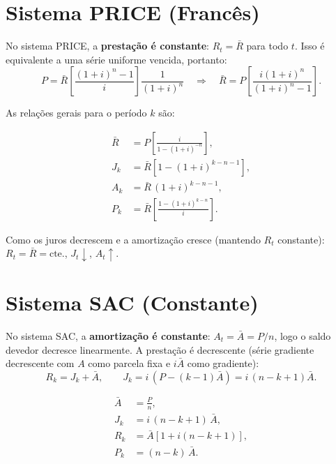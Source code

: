 \section{Sistema PRICE (Francês)}

No sistema PRICE, a \textbf{prestação é constante}: $R_t = \bar{R}$ para todo $t$.
Isso é equivalente a uma série uniforme vencida, portanto:
\[
  P = \bar{R}\left[\frac{(1+i)^n - 1}{i}\right]\frac{1}{(1+i)^n}
  \quad\Rightarrow\quad
  \bar{R} = P\left[\frac{i(1+i)^n}{(1+i)^n-1}\right].
\]

As relações gerais para o período $k$ são:
\begin{resultado}
\begin{align*}
  \bar{R}   &= P\left[\frac{i}{1-(1+i)^{-n}}\right], \\
  J_k       &= \bar{R}\left[1-(1+i)^{k-n-1}\right], \\
  A_k       &= \bar{R}\,(1+i)^{k-n-1}, \\
  P_k       &= \bar{R}\left[\frac{1-(1+i)^{k-n}}{i}\right].
\end{align*}
\end{resultado}

\noindent Como os juros decrescem e a amortização cresce (mantendo $R_t$ constante):
$R_t = \bar{R} = \text{cte.}$, $J_t \downarrow$, $A_t \uparrow$.

\section{Sistema SAC (Constante)}

No sistema SAC, a \textbf{amortização é constante}: $A_t = \bar{A} = P/n$,
logo o saldo devedor decresce linearmente.
A prestação é decrescente (série gradiente decrescente com $A$ como parcela fixa e $i\bar{A}$ como gradiente):
\[
  R_k = J_k + \bar{A}, \qquad J_k = i\,(P - (k-1)\bar{A}) = i\,(n-k+1)\bar{A}.
\]

\begin{resultado}
\begin{align*}
  \bar{A}   &= \frac{P}{n}, \\
  J_k       &= i\,(n-k+1)\,\bar{A}, \\
  R_k       &= \bar{A}\left[1 + i(n-k+1)\right], \\
  P_k       &= (n-k)\,\bar{A}.
\end{align*}
\end{resultado}

